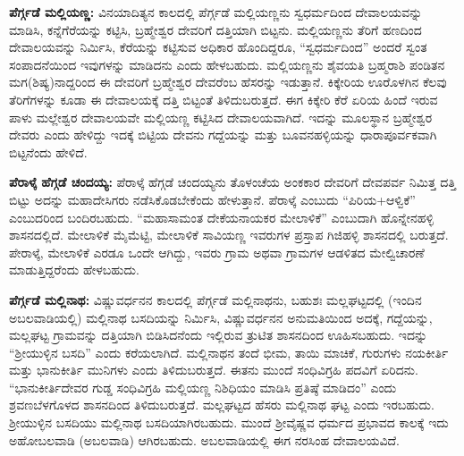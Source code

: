 \textbf{ಪೆರ್ಗ್ಗಡೆ ಮಲ್ಲಿಯಣ್ಣ:} ವಿನಯಾದಿತ್ಯನ ಕಾಲದಲ್ಲಿ ಪೆರ್ಗ್ಗಡೆ ಮಲ್ಲಿಯಣ್ಣನು ಸ್ವಧರ್ಮದಿಂದ ದೇವಾಲಯವನ್ನು ಮಾಡಿಸಿ, ಕನ್ನೆಗೆರೆಯನ್ನು ಕಟ್ಟಿಸಿ, ಬ್ರಹ್ಮೇಶ್ವರ ದೇವರಿಗೆ ದತ್ತಿಯಾಗಿ ಬಿಟ್ಟನು. ಮಲ್ಲಿಯಣ್ಣನು ತೆರಿಗೆ ಹಣದಿಂದ ದೇವಾಲಯವನ್ನು ನಿರ್ಮಿಸಿ, ಕೆರೆಯನ್ನು ಕಟ್ಟಿಸುವ ಅಧಿಕಾರ ಹೊಂದಿದ್ದರೂ, “ಸ್ವಧರ್ಮದಿಂದ” ಅಂದರೆ ಸ್ವಂತ ಸಂಪಾದನೆ\-ಯಿಂದ ಇವುಗಳನ್ನು ಮಾಡಿದನು ಎಂದು ಹೇಳಬಹುದು. ಮಲ್ಲಿಯಣ್ಣನು ಶೈವಯತಿ ಬ್ರಹ್ಮರಾಶಿ ಪಂಡಿತನ ಮಗ(ಶಿಷ್ಯ)\-ನಾದ್ದರಿಂದ ಈ ದೇವರಿಗೆ ಬ್ರಹ್ಮೇಶ್ವರ ದೇವರೆಂಬ ಹೆಸರನ್ನು ಇಡುತ್ತಾನೆ. ಕಿಕ್ಕೇರಿಯ ಊರೊಳಗಿನ ಕೆಲವು ತೆರಿಗೆಗಳನ್ನು ಕೂಡಾ ಈ ದೇವಾಲಯಕ್ಕೆ ದತ್ತಿ ಬಿಟ್ಟಂತೆ ತಿಳಿದುಬರುತ್ತದೆ. ಈಗ ಕಿಕ್ಕೇರಿ ಕೆರೆ ಏರಿಯ ಹಿಂದೆ ಇರುವ ಪಾಳು ಮಲ್ಲೇಶ್ವರ ದೇವಾಲಯವೇ ಮಲ್ಲಿಯಣ್ಣ ಕಟ್ಟಿಸಿದ ದೇವಾಲಯವಾಗಿದೆ. ಇದನ್ನು ಮೂಲಸ್ಥಾನ ಬ್ರಹ್ಮೇಶ್ವರ ದೇವರು ಎಂದು ಹೇಳಿದ್ದು ಇದಕ್ಕೆ ಬಿಟ್ಟಿಯ ದೇವನು ಗದ್ದೆಯನ್ನು ಮತ್ತು ಬೂವನಹಳ್ಳಿಯನ್ನು ಧಾರಾಪೂರ್ವಕವಾಗಿ ಬಿಟ್ಟನೆಂದು ಹೇಳಿದೆ.

\textbf{ಪೆರಾಳ್ಕೆ ಹೆಗ್ಗಡೆ ಚಂದಯ್ಯ:} ಪೆರಾಳ್ಕೆ ಹೆಗ್ಗಡೆ ಚಂದಯ್ಯನು ತೊಳಂಚೆಯ ಅಂಕಕಾರ ದೇವರಿಗೆ ದೇವಪರ್ವ ನಿಮಿತ್ತ ದತ್ತಿ ಬಿಟ್ಟು ಅದನ್ನು ಮಹಾದೇಸಿಗರು ನಡೆಸಿಕೊಡಬೇಕೆಂದು ಹೇಳುತ್ತಾನೆ. ಪೆರಾಳ್ಕೆ ಎಂಬುದು “ಪಿರಿಯ+ಆಳ್ವಿಕೆ” ಎಂಬುದರಿಂದ ಬಂದಿರಬಹುದು. “ಮಹಾಸಾಮಂತ ದೇಕೆಯನಾಯಕರ ಮೇಲಾಳಿಕೆ” ಎಂಬುದಾಗಿ ಹೊನ್ನೇನಹಳ್ಳಿ ಶಾಸನದಲ್ಲಿದೆ. ಮೇಲಾಳಿಕೆ ಮೈಮೆಟ್ಟಿ, ಮೇಲಾಳಿಕೆ ಸಾವಿಯಣ್ಣ ಇವರುಗಳ ಪ್ರಸ್ತಾಪ ಗಿಜಿಹಳ್ಳಿ ಶಾಸನದಲ್ಲಿ ಬರುತ್ತದೆ. ಪೇರಾಳ್ಕೆ, ಮೇಲಾಳಿಕೆ ಎರಡೂ ಒಂದೇ ಆಗಿದ್ದು, ಇವರು ಗ್ರಾಮ ಅಥವಾ ಗ್ರಾಮಗಳ ಆಡಳಿತದ ಮೇಲ್ವಿಚಾರಣೆ ಮಾಡುತ್ತಿದ್ದರೆಂದು ಹೇಳಬಹುದು.

\textbf{ಪೆರ್ಗ್ಗಡೆ ಮಲ್ಲಿನಾಥ:} ವಿಷ್ಣುವರ್ಧನನ ಕಾಲದಲ್ಲಿ ಪೆರ್ಗ್ಗಡೆ ಮಲ್ಲಿನಾಥನು, ಬಹುಶಃ ಮಲ್ಲಘಟ್ಟದಲ್ಲಿ (ಇಂದಿನ ಅಬಲವಾಡಿಯಲ್ಲಿ) ಮಲ್ಲಿನಾಥ ಬಸದಿಯನ್ನು ನಿರ್ಮಿಸಿ, ವಿಷ್ಣುವರ್ಧನನ ಅನುಮತಿಯಿಂದ ಅದಕ್ಕೆ, ಗದ್ದೆಯನ್ನು, ಮಲ್ಲಘಟ್ಟ ಗ್ರಾಮವನ್ನು ದತ್ತಿಯಾಗಿ ಬಿಡಿಸಿದನೆಂದು ಇಲ್ಲಿರುವ ತ್ರುಟಿತ ಶಾಸನದಿಂದ ಊಹಿಸಬಹುದು. ಇದನ್ನು “ಶ‍್ರೀಯುಳ್ಳಿನ ಬಸದಿ” ಎಂದು ಕರೆಯಲಾಗಿದೆ. ಮಲ್ಲಿನಾಥನ ತಂದೆ ಭೀಮ, ತಾಯಿ ಮಾಚಿಕೆ, ಗುರುಗಳು ನಯಕೀರ್ತಿ ಮತ್ತು ಭಾನುಕೀರ್ತಿ ಮುನಿಗಳು ಎಂದು ತಿಳಿದುಬರುತ್ತದೆ. ಈತನು ಮುಂದೆ ಸಂಧಿವಿಗ್ರಹಿ ಪದವಿಗೆ ಏರಿದನು. “ಭಾನುಕೀರ್ತಿದೇವರ ಗುಡ್ಡ ಸಂಧಿವಿಗ್ರಹಿ ಮಲ್ಲಿಯಣ್ಣ ನಿಶಿಧಿಯಂ ಮಾಡಿಸಿ ಪ್ರತಿಷ್ಠೆ ಮಾಡಿದಂ” ಎಂದು ಶ್ರವಣಬೆಳಗೊಳದ ಶಾಸನದಿಂದ ತಿಳಿದುಬರುತ್ತದೆ. ಮಲ್ಲಘಟ್ಟದ ಹೆಸರು ಮಲ್ಲಿನಾಥ ಘಟ್ಟ ಎಂದು ಇರಬಹುದು. ಶ‍್ರೀಯುಳ್ಳಿನ ಬಸದಿಯು ಮಲ್ಲಿನಾಥ ಬಸದಿಯಾಗಿರಬಹುದು. ಮುಂದೆ ಶ‍್ರೀವೈಷ್ಣವ ಧರ್ಮದ ಪ್ರಭಾವದ ಕಾಲಕ್ಕೆ ಇದು ಅಹೋಬಲವಾಡಿ (ಅಬಲವಾಡಿ) ಆಗಿರಬಹುದು. ಅಬಲವಾಡಿಯಲ್ಲಿ ಈಗ ನರಸಿಂಹ ದೇವಾಲಯವಿದೆ.

